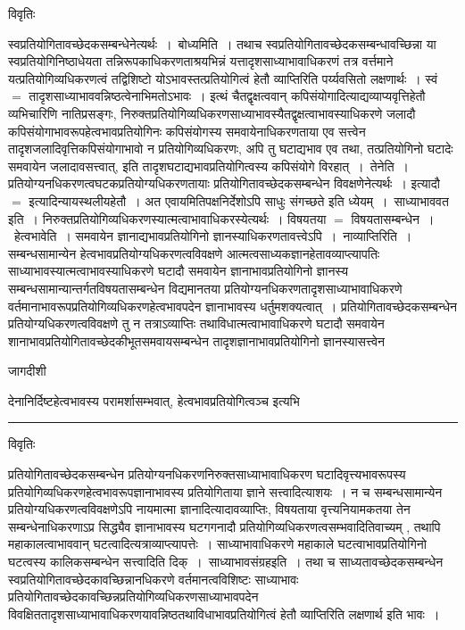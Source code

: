 \documentclass[10pt, openany]{book}
\begin{document}
{\begin{center}     विवृतिः \end{center}
स्वप्रतियोगितावच्छेदकसम्बन्धेनेत्यर्थः~।~{\la बोध्यमिति~।} तथाच स्वप्रतियोगितावच्छेदकसम्बन्धावच्छिन्ना या स्वप्रतियोगिनिष्ठाधेयता तन्निरूपकाधिकरणताश्रयभिन्नं यत्तादृशसाध्याभावाधिकरणं तत्र वर्त्तमाने यत्प्रतियोगिव्यधिकरणत्वं तद्विशिष्टो योऽभावस्तत्प्रतियोगित्वं हेतौ व्याप्तिरिति पर्य्यवसितो लक्षणार्थः~। स्वं $=$ तादृशसाध्याभाववन्निष्ठत्वेनाभिमतोऽभावः~। इत्थं चैतद्वृक्षत्ववान् कपिसंयोगादित्याद्यव्याप्यवृत्तिहेतौ व्यभिचारिणि नातिप्रसङ्गः, निरुक्तप्रतियोगिव्यधिकरणसाध्याभावस्यैतद्वृक्षत्वाभावस्याधिकरणे जलादौ कपिसंयोगाभावरूपहेत्वभावप्रतियोगिनः कपिसंयोगस्य समवायेनाधिकरणताया एव सत्त्वेन तादृशजलादिवृत्तिकपिसंयोगाभावो न प्रतियोगिव्यधिकरणः, अपि तु घटाद्यभाव एव तथा, तत्प्रतियोगिनो {\qt घटादेः समवायेन जलादावसत्त्वात्}, इति तादृशघटाद्यभावप्रतियोगित्वस्य कपिसंयोगे विरहात्~।~{\la तेनेति~।} प्रतियोग्यनधिकरणत्वघटकप्रतियोग्यधिकरणतायाः प्रतियोगितावच्छेदकसम्बन्धेन विवक्षणेनेत्यर्थः~। इत्यादौ $=$ इत्यादिन्यायस्थलीयहेतौ~। अत एवायमितिपक्षनिर्देशोऽपि साधुः संगच्छते इति ध्येयम्~।~{\la साध्याभाववत इति~।}
निरुक्तप्रतियोगिव्यधिकरणस्यात्मत्वाभावाधिकरस्येत्यर्थः~। विषयतया $=$ विषयतासम्बन्धेन~।~{\la हेत्वभावेति~।} समवायेन ज्ञानाद्यभावप्रतियोगिनो
ज्ञानस्याधिकरणतावत्त्वेऽपि~।~{\la नाव्याप्तिरिति~।} सम्बन्धसामान्येन हेत्वभावप्रतियोग्यधिकरणत्वविवक्षणे आत्मत्वसाध्यकज्ञानहेतावव्याप्त्यापतिः
साध्याभावस्यात्मत्वाभावस्याधिकरणे घटादौ समवायेन ज्ञानाभावप्रतियोगिनो ज्ञानस्य सम्बन्धसामान्यान्तर्गतविषयतासम्बन्धेन विद्यमानतया प्रतियोग्यनधिकरणतादृशसाध्याभावाधिकरणे वर्तमानाभावरूपप्रतियोगिव्यधिकरणहेत्वभावपदेन ज्ञानाभावस्य धर्तुमशक्यत्वात्~। प्रतियोगितावच्छेदकसम्बन्धेन प्रतियोग्यधिकरणत्वविवक्षणे तु न तत्राऽव्याप्तिः तथाविधात्मत्वाभावाधिकरणे घटादौ समवायेन शानाभावप्रतियोगितावच्छेदकीभूतसमवायसम्बन्धेन तादृशज्ञानाभावप्रतियोगिनो ज्ञानस्यासत्त्वेन
\newpage
\begin{center} जागदीशी \end{center}
{\la देनानिर्दिष्टहेत्वभावस्य परामर्शासम्भवात्, हेत्वभावप्रतियोगित्वञ्च इत्यभि}\\
\hrule
\begin{center}     विवृतिः \end{center}
प्रतियोगितावच्छेदकसम्बन्धेन प्रतियोग्यनधिकरणनिरुक्तसाध्याभावाधिकरण घटादिवृत्त्यभावरूपस्य प्रतियोगिव्यधिकरणहेत्वभावरूपज्ञानाभावस्य प्रतियोगिताया ज्ञाने सत्त्वादित्याशयः~। न च सम्बन्धसामान्येन प्रतियोग्यधिकरणत्वविवक्षणेऽपि नायमात्मा ज्ञानादित्यादावव्याप्तिः, विषयताया वृत्त्यनियामकतया तेन सम्बन्धेनाधिकरणाऽप्र सिद्ध्यैव ज्ञानाभावस्य घटगगनादौ प्रतियोगिव्यधिकरणत्वसम्भवादितिवाच्यम् , तथापि महाकालत्वाभाववान् घटत्वादित्यत्राव्याप्त्यापत्तेः~। साध्याभावाधिकरणे महाकाले घटत्वाभावप्रतियोगिनो घटत्वस्य कालिकसम्बन्धेन सत्त्वादिति दिक्~।~{\la साध्याभावसंग्रहइति~।} तथा च साध्यतावच्छेदकसम्बन्धेन स्वप्रतियोगितावच्छेदकावच्छिन्नानधिकरणे वर्तमानत्वविशिष्टः साध्याभावः प्रतियोगितावच्छेदकावच्छिन्नप्रतियोगिव्यधिकरणसाध्याभावपदेन विवक्षिततादृशसाध्याभावाधिकरणयावन्निष्ठतथाविधाभावप्रतियोगित्वं हेतौ व्याप्तिरिति लक्षणार्थ इति भावः~।
}
\end{document}
